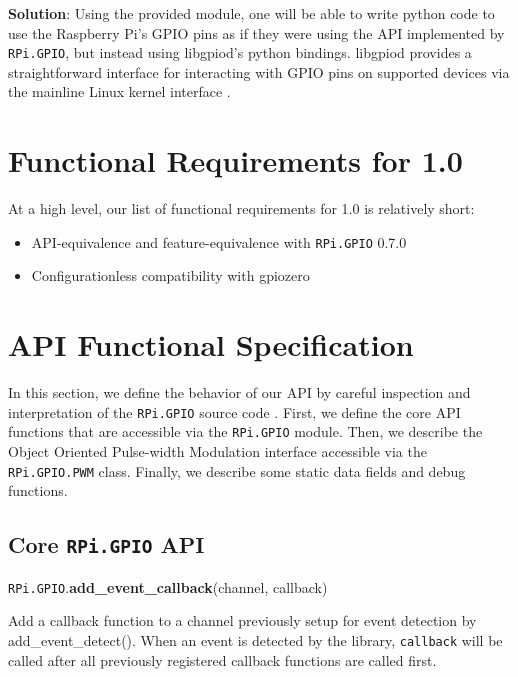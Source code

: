 \documentclass[12pt]{article}
\begin{document}
\textbf{Solution}:
Using the provided module, one will be able to write python code to use the Raspberry Pi's GPIO pins as if they were using the API implemented by \texttt{RPi.GPIO}, but instead using libgpiod's python bindings. libgpiod provides a straightforward interface for interacting with GPIO pins on supported devices via the mainline Linux kernel interface \cite{libgpiod}.

\section{Functional Requirements for 1.0}

At a high level, our list of functional requirements for 1.0 is relatively short:
\begin{itemize}
    \item API-equivalence and feature-equivalence with \texttt{RPi.GPIO} 0.7.0
    \item Configurationless compatibility with gpiozero \cite{gpiozero}
\end{itemize}

\section{API Functional Specification}

In this section, we define the behavior of our API by careful inspection and interpretation of the \texttt{RPi.GPIO} source code \cite{rpigpio}.
First, we define the core API functions that are accessible via the \texttt{RPi.GPIO} module.
Then, we describe the Object Oriented Pulse-width Modulation interface accessible via the \texttt{RPi.GPIO.PWM} class. Finally, we describe some static data fields and debug functions.

\subsection{Core \texttt{RPi.GPIO} API} \label{coreapi}
 
\texttt{RPi.GPIO}.\textbf{add\_event\_callback}(channel, callback)



Add a callback function to a channel previously setup for event detection by add\_event\_detect(). When an event is detected by the library, \texttt{callback} will be called after all previously registered callback functions are called first.
\end{document}

